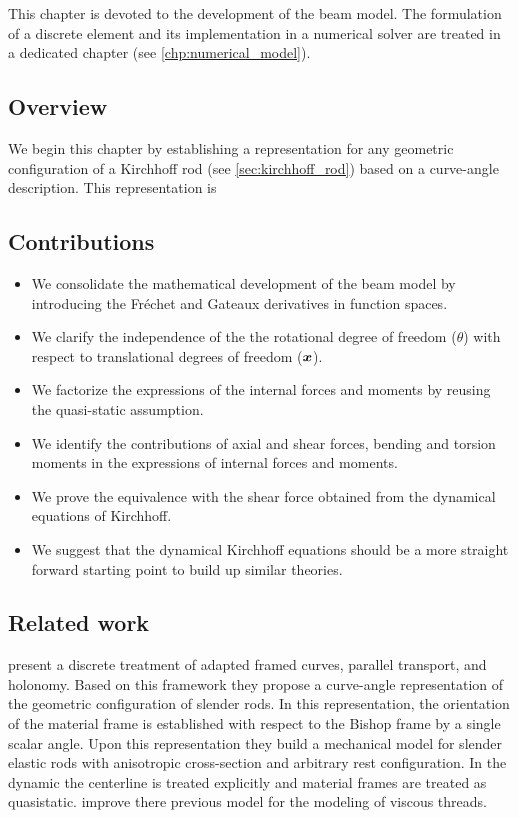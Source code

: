 This chapter is devoted to the development of the beam model. The formulation of a discrete element and its implementation in a numerical solver are treated in a dedicated chapter (see \cref{chp:numerical_model}).

\subsection{Overview}
We begin this chapter by establishing a representation for any geometric configuration of a Kirchhoff rod (see \cref{sec:kirchhoff_rod}) based on a curve-angle description. This representation is 

\subsection{Contributions}
\begin{itemize}
\item We consolidate the mathematical development of the beam model by introducing the Fréchet and Gateaux derivatives in function spaces.
\item We clarify the independence of the the rotational degree of freedom ($\theta$) with respect to  translational degrees of freedom ($\boldsymbol{x}$).
\item We factorize the expressions of the internal forces and moments by reusing the quasi-static assumption.
\item We identify the contributions of axial and shear forces, bending and torsion moments in the expressions of internal forces and moments.
\item We prove the equivalence with the shear force obtained from the dynamical equations of Kirchhoff.
\item We suggest that the dynamical Kirchhoff equations should be a more straight forward starting point to build up similar theories.
\end{itemize}

\subsection{Related work}
 present a discrete treatment of adapted framed curves, parallel transport, and holonomy. Based on this framework they propose a curve-angle representation of the geometric configuration of slender rods. In this representation, the orientation of the material frame is established with respect to the Bishop frame by a single scalar angle. Upon this representation they build a mechanical model for slender elastic rods with anisotropic cross-section and arbitrary rest configuration. In the dynamic the centerline is treated explicitly and material frames are treated as quasistatic.  improve there previous model for the modeling of viscous threads.

